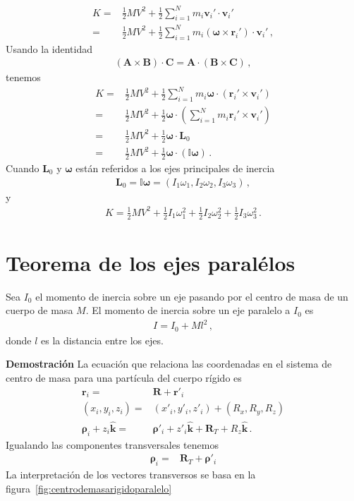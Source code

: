 \begin{align*}
 K =&\frac{1}{2}M V^2+\frac{1}{2}\sum_{i=1}^N m_i \mathbf{v}_i'\cdot\mathbf{v}_i'\nonumber\\
 =&\frac{1}{2}M V^2+\frac{1}{2}\sum_{i=1}^N m_i (\boldsymbol{\omega}\times \mathbf{r}_i')\cdot\mathbf{v}_i'\,,
\end{align*}
Usando la identidad
\begin{align}
  (\mathbf{A}\times\mathbf{B})\cdot \mathbf{C}=\mathbf{A}\cdot(\mathbf{B}\times\mathbf{C})\,,
\end{align}
tenemos
\begin{align}
K =&\frac{1}{2}M V^2+\frac{1}{2}\sum_{i=1}^N m_i \boldsymbol{\omega}\cdot( \mathbf{r}_i'\times\mathbf{v}_i')\nonumber\\
=&\frac{1}{2}M V^2+\frac{1}{2}\boldsymbol{\omega}\cdot
\left(\sum_{i=1}^N m_i  \mathbf{r}_i'\times\mathbf{v}_i'\right)\nonumber\\
    =&\frac{1}{2}M V^2+\frac{1}{2}\boldsymbol{\omega}\cdot
  \mathbf{L}_0\nonumber\\
=&\frac{1}{2}M V^2+\frac{1}{2}\boldsymbol{\omega}\cdot
  \left(\mathbb{I}\boldsymbol{\omega}\right)\,.
\end{align}
Cuando $\mathbf{L}_0$ y $\boldsymbol{\omega}$ están referidos a los ejes principales de inercia
\begin{align}
  \mathbf{L}_0=\mathbb{I}\boldsymbol{\omega}=  \left(I_1\omega_1,I_2\omega_2,I_3\omega_3  \right)\,,
\end{align}
y
\begin{align}
  K=\frac{1}{2}MV^2+\frac{1}{2}I_1\omega_1^2+\frac{1}{2}I_2\omega_2^2+\frac{1}{2}I_3\omega_3^2\,.
\end{align}

\section{Teorema de los ejes paralélos}

Sea $I_0$ el momento de inercia sobre un eje pasando por el centro de masa de un cuerpo de masa $M$. El momento de inercia sobre un eje paralelo a $I_0$ es
\begin{align}
  I=I_0+M l^2\,,
\end{align}
donde $l$ es la distancia entre los ejes.

\noindent
\textbf{Demostración} La ecuación que relaciona las coordenadas en el sistema de centro de masa para una partícula del cuerpo rígido es
  \begin{align}
    \mathbf{r}_i=&\mathbf{R}+\mathbf{r}'_i\nonumber\\
    (x_i,y_i,z_i)=&(x'_i,y'_i,z'_i)+(R_x,R_y,R_z)\nonumber\\
    \boldsymbol{\rho}_i+z_i\hat{\mathbf{k}}=& \boldsymbol{\rho}'_i+z'_i\hat{\mathbf{k}}+\mathbf{R}_T+R_z\hat{\mathbf{k}}\,.
  \end{align}
Igualando las componentes transversales tenemos
\begin{align}
  \boldsymbol{\rho}_i=& \mathbf{R}_T+\boldsymbol{\rho}'_i
\end{align}
La interpretación de los vectores transversos se basa en la figura~\ref{fig:centrodemasarigidoparalelo}

